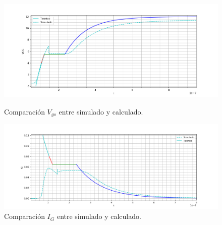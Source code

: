 \begin{figure}[H]
	\centering
	\begin{minipage}{0.5\textwidth}
		\centering
		\includegraphics[width=1.1\textwidth]{ImagenesEjercicio-1/sim_encendido_gate} %
		\caption{Comparación $V_{gs}$ entre simulado y calculado.}
		\label{ej1:fig:sim_encendido_gate}
	\end{minipage}\hfill
	\begin{minipage}{0.5\textwidth}
		\centering
		\includegraphics[width=1.1\textwidth]{ImagenesEjercicio-1/sim_encendido_gate_i} %
		\caption{Comparación $I_{G}$ entre simulado y calculado.}
		\label{ej1:fig:sim_encendido_gate_i}
	\end{minipage}
\end{figure}

